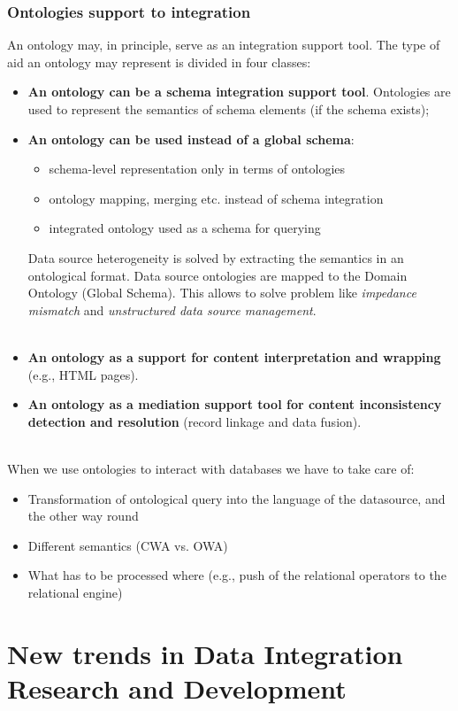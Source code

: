 \documentclass[10pt,a4paper]{article}
\newcommand{\nline}{\\~\\}
\begin{document}
\begin{justify}
\subsubsection{Ontologies support to integration}
An ontology may, in principle, serve as an integration support tool. The type of aid an ontology may represent is divided in four classes:
\begin{itemize}
    \item \textbf{An ontology can be a schema integration support tool}. Ontologies are used to represent the semantics of schema elements (if the schema exists);
    \item \textbf{An ontology can be used instead of a global schema}:
    \begin{itemize}
    	\item schema-level representation only in terms of ontologies
	    \item ontology mapping, merging etc. instead of schema integration
	\item integrated ontology used as a schema for querying
\end{itemize}
    Data source heterogeneity is solved by extracting the semantics in an ontological format. Data source ontologies are mapped to the Domain Ontology (Global Schema). This allows to solve problem like \textit{impedance mismatch} and \textit{unstructured data source management}. \nline
    \item \textbf{An ontology as a support for content interpretation and wrapping} (e.g., HTML pages). \item \textbf{An ontology as a mediation support tool for content inconsistency detection and resolution} (record linkage and data fusion).
\nline
\end{itemize}
When we use ontologies to interact with databases we have to take care of:
\begin{itemize}
	\item Transformation of ontological query into the language of the datasource, and the other way round
	\item Different semantics (CWA vs. OWA)
	\item What has to be processed where (e.g., push of the relational operators to the relational engine)
\end{itemize}
\pagebreak
\section{New trends in Data Integration Research and Development}

\end{justify}
\end{document}
